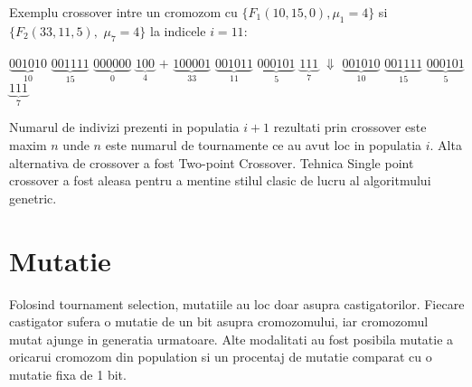 Exemplu crossover intre un cromozom cu $\{F_{1}(10,15,0), \mu_{1} = 4\}$ si $\{F_{2}(33,11,5),$ \linebreak $\mu_{7} = 4\}$ la indicele $i=11$:
\begin{center}
    $\underbrace{001010}_{10}$ $\underbrace{001111}_{15}$ $\underbrace{000000}_{0}$ $\underbrace{100}_{4}$ \linebreak \linebreak
    $+$ \linebreak
    $\underbrace{100001}_{33}$ $\underbrace{001011}_{11}$ $\underbrace{000101}_{5}$ $\underbrace{111}_{7}$ \linebreak \linebreak
    $\Downarrow$ \linebreak
    $\underbrace{001010}_{10}$ $\underbrace{001111}_{15}$ $\underbrace{000101}_{5}$ $\underbrace{111}_{7}$ \linebreak \linebreak
\end{center}

Numarul de indivizi prezenti in populatia $i+1$ rezultati prin crossover este maxim $n$ unde $n$ este numarul de tournamente ce au avut loc in populatia $i$. Alta alternativa de crossover a fost Two-point Crossover. Tehnica Single point crossover a fost aleasa pentru a mentine stilul clasic de lucru al algoritmului genetric.
\section{Mutatie}

Folosind tournament selection, mutatiile au loc doar asupra castigatorilor. Fiecare castigator sufera o mutatie de un bit asupra cromozomului, iar cromozomul mutat ajunge in generatia urmatoare. Alte modalitati au fost posibila mutatie a oricarui cromozom din population si un procentaj de mutatie comparat cu o mutatie fixa de 1 bit.
